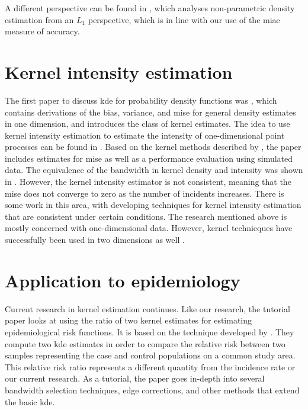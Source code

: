 A different perspective can be found in \citet{devroye1985nonparametric},
which analyses non-parametric density estimation from an $L_1$ perspective,
which is in line with our use of the \gls{miae} measure of accuracy.

\section{Kernel intensity estimation}

The first paper to discuss \gls{kde} for probability density functions was \citet{rosenblatt1956remarks},
which contains derivations of the bias, variance, and \acrfull{mise} for general density estimates in one dimension,
and introduces the class of kernel estimates.
The idea to use \gls{kernel intensity estimation} to estimate the intensity of one-dimensional point processes can be found in 
.
Based on the kernel methods described by \citet{rosenblatt1956remarks},
the paper includes estimates for \gls{mise} as well as a performance evaluation using simulated data.
The equivalence of the bandwidth in kernel density and intensity was shown in \citet{diggle1988equivalence}.
However,
the \gls{kernel intensity estimator} is not consistent,
meaning that the \gls{mise} does not converge to zero as the number of incidents increases.
There is some work in this area,
with \citet{guan2008consistent,fuentes2016consistent} developing techniques for \gls{kernel intensity estimation} that are consistent under certain conditions.
The research mentioned above is mostly concerned with one-dimensional data.
However, kernel technieques have successfully been used in two dimensions as well \citep{scott1992multivariate}.

\section{Application to epidemiology}

Current research in kernel estimation continues.
Like our research, the tutorial paper \citet{davies2018tutorial} looks at using the ratio of two kernel estimates for estimating epidemiological risk functions.
It is based on the technique developed by \citet{bithell1990application,bithell1991estimation}.
They compute two \gls{kde} estimates in order to compare the relative risk between two samples representing the case and control populations on a common study area.
This relative risk ratio represents a different quantity from the incidence rate or our current research.
As a tutorial, the paper goes in-depth into several bandwidth selection techniques,
edge corrections, and other methods that extend the basic \gls{kde}.

